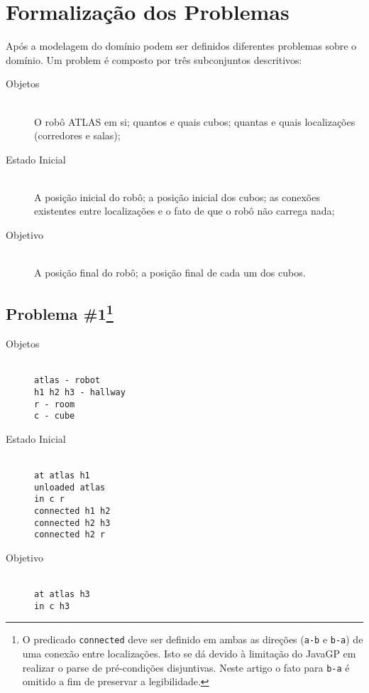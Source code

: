 \documentclass[letterpaper]{article}
\begin{document}
\section{Formalização dos Problemas}

Após a modelagem do domínio podem ser definidos diferentes problemas sobre o domínio. Um problem é composto por três subconjuntos descritivos:

\begin{description}
\item[Objetos]\hfill\\O robô ATLAS em si; quantos e quais cubos; quantas e quais localizações (corredores e salas);
\item[Estado Inicial]\hfill\\A posição inicial do robô; a posição inicial dos cubos; as conexões existentes entre localizações e o fato de que o robô não carrega nada;
\item[Objetivo]\hfill\\A posição final do robô; a posição final de cada um dos cubos.
\end{description}

\subsection{Problema \#1\footnote{O predicado \texttt{connected} deve ser definido em ambas as direções (\texttt{a-b} e \texttt{b-a}) de uma conexão entre localizações. Isto se dá devido à limitação do JavaGP em realizar o parse de pré-condições disjuntivas. Neste artigo o fato para \texttt{b-a} é omitido a fim de preservar a legibilidade.}}
\begin{description}
  \item[Objetos]\hfill\\
    \texttt{atlas - robot\\h1 h2 h3 - hallway\\r - room\\c - cube}
  \item[Estado Inicial]\hfill\\
    \texttt{at atlas h1\\unloaded atlas\\in c r\\connected h1 h2\\connected h2 h3\\connected h2 r}
  \item[Objetivo]\hfill\\
    \texttt{at atlas h3\\in c h3}
\end{description}
\end{document}
